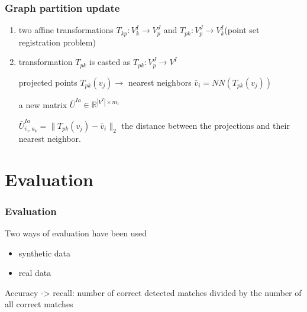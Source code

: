 \documentclass[handout]{beamer}
\begin{document}
\begin{frame}
\frametitle{Graph partition update}
\begin{enumerate}
\item two affine transformations $T_{kp}:V^I_k\rightarrow V^J_p$ and $T_{pk}:V^J_p\rightarrow V^I_k$(point set registration problem)
\item transformation $T_{pk}$ is casted as $T_{pk}:V^J_p\rightarrow V^I$

 projected points $T_{pk}(v_j) \rightarrow$ nearest neighbors $\bar{v}_i=NN(T_{pk}(v_j))$ 
 
 a new matrix $\bar{U}^{Ia}\in\mathbb{R}^{|V^I|\times m_1}$ 
 
 $\bar{U}^{Ia}_{\bar{v}_i,a_k}=\|T_{pk}(v_j)-\bar{v}_i\|_2$ the distance between the projections and their nearest neighbor.
\end{enumerate}
\end{frame}
\section{Evaluation} 
\begin{frame}
\frametitle{Evaluation}
Two ways of evaluation have been used
\begin{itemize}
\item synthetic data
\item real data
\end{itemize}

Accuracy -> recall: number of correct detected matches divided by the number of all correct matches
\end{frame}
\end{document}
